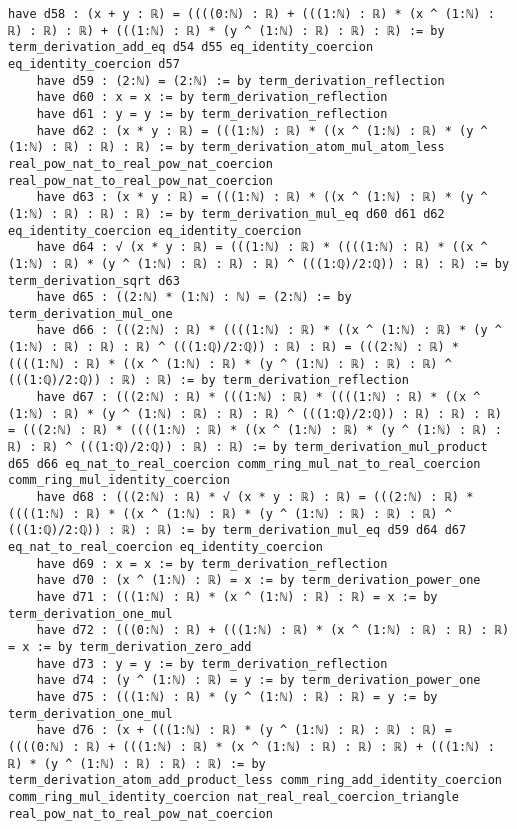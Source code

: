 \documentclass{article}
\begin{document}
\begin{tcolorbox}[colback=white!10, width=\linewidth]
\begin{lstlisting}[language=Lean4]
    have d58 : (x + y : ℝ) = ((((0:ℕ) : ℝ) + (((1:ℕ) : ℝ) * (x ^ (1:ℕ) : ℝ) : ℝ) : ℝ) + (((1:ℕ) : ℝ) * (y ^ (1:ℕ) : ℝ) : ℝ) : ℝ) := by term_derivation_add_eq d54 d55 eq_identity_coercion eq_identity_coercion d57
    have d59 : (2:ℕ) = (2:ℕ) := by term_derivation_reflection
    have d60 : x = x := by term_derivation_reflection
    have d61 : y = y := by term_derivation_reflection
    have d62 : (x * y : ℝ) = (((1:ℕ) : ℝ) * ((x ^ (1:ℕ) : ℝ) * (y ^ (1:ℕ) : ℝ) : ℝ) : ℝ) := by term_derivation_atom_mul_atom_less real_pow_nat_to_real_pow_nat_coercion real_pow_nat_to_real_pow_nat_coercion
    have d63 : (x * y : ℝ) = (((1:ℕ) : ℝ) * ((x ^ (1:ℕ) : ℝ) * (y ^ (1:ℕ) : ℝ) : ℝ) : ℝ) := by term_derivation_mul_eq d60 d61 d62 eq_identity_coercion eq_identity_coercion
    have d64 : √ (x * y : ℝ) = (((1:ℕ) : ℝ) * ((((1:ℕ) : ℝ) * ((x ^ (1:ℕ) : ℝ) * (y ^ (1:ℕ) : ℝ) : ℝ) : ℝ) ^ (((1:ℚ)/2:ℚ)) : ℝ) : ℝ) := by term_derivation_sqrt d63
    have d65 : ((2:ℕ) * (1:ℕ) : ℕ) = (2:ℕ) := by term_derivation_mul_one
    have d66 : (((2:ℕ) : ℝ) * ((((1:ℕ) : ℝ) * ((x ^ (1:ℕ) : ℝ) * (y ^ (1:ℕ) : ℝ) : ℝ) : ℝ) ^ (((1:ℚ)/2:ℚ)) : ℝ) : ℝ) = (((2:ℕ) : ℝ) * ((((1:ℕ) : ℝ) * ((x ^ (1:ℕ) : ℝ) * (y ^ (1:ℕ) : ℝ) : ℝ) : ℝ) ^ (((1:ℚ)/2:ℚ)) : ℝ) : ℝ) := by term_derivation_reflection
    have d67 : (((2:ℕ) : ℝ) * (((1:ℕ) : ℝ) * ((((1:ℕ) : ℝ) * ((x ^ (1:ℕ) : ℝ) * (y ^ (1:ℕ) : ℝ) : ℝ) : ℝ) ^ (((1:ℚ)/2:ℚ)) : ℝ) : ℝ) : ℝ) = (((2:ℕ) : ℝ) * ((((1:ℕ) : ℝ) * ((x ^ (1:ℕ) : ℝ) * (y ^ (1:ℕ) : ℝ) : ℝ) : ℝ) ^ (((1:ℚ)/2:ℚ)) : ℝ) : ℝ) := by term_derivation_mul_product d65 d66 eq_nat_to_real_coercion comm_ring_mul_nat_to_real_coercion comm_ring_mul_identity_coercion
    have d68 : (((2:ℕ) : ℝ) * √ (x * y : ℝ) : ℝ) = (((2:ℕ) : ℝ) * ((((1:ℕ) : ℝ) * ((x ^ (1:ℕ) : ℝ) * (y ^ (1:ℕ) : ℝ) : ℝ) : ℝ) ^ (((1:ℚ)/2:ℚ)) : ℝ) : ℝ) := by term_derivation_mul_eq d59 d64 d67 eq_nat_to_real_coercion eq_identity_coercion
    have d69 : x = x := by term_derivation_reflection
    have d70 : (x ^ (1:ℕ) : ℝ) = x := by term_derivation_power_one
    have d71 : (((1:ℕ) : ℝ) * (x ^ (1:ℕ) : ℝ) : ℝ) = x := by term_derivation_one_mul
    have d72 : (((0:ℕ) : ℝ) + (((1:ℕ) : ℝ) * (x ^ (1:ℕ) : ℝ) : ℝ) : ℝ) = x := by term_derivation_zero_add
    have d73 : y = y := by term_derivation_reflection
    have d74 : (y ^ (1:ℕ) : ℝ) = y := by term_derivation_power_one
    have d75 : (((1:ℕ) : ℝ) * (y ^ (1:ℕ) : ℝ) : ℝ) = y := by term_derivation_one_mul
    have d76 : (x + (((1:ℕ) : ℝ) * (y ^ (1:ℕ) : ℝ) : ℝ) : ℝ) = ((((0:ℕ) : ℝ) + (((1:ℕ) : ℝ) * (x ^ (1:ℕ) : ℝ) : ℝ) : ℝ) + (((1:ℕ) : ℝ) * (y ^ (1:ℕ) : ℝ) : ℝ) : ℝ) := by term_derivation_atom_add_product_less comm_ring_add_identity_coercion comm_ring_mul_identity_coercion nat_real_real_coercion_triangle real_pow_nat_to_real_pow_nat_coercion

\end{lstlisting}
\end{tcolorbox}
\end{document}
